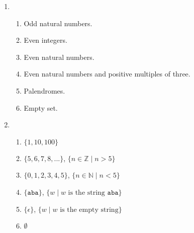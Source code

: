 \documentclass[11pt]{article}
\begin{document}
\begin{enumerate}[0.1]
  \item
  \begin{enumerate}
    \item Odd natural numbers.
    \item Even integers.
    \item Even natural numbers.
    \item Even natural numbers and positive multiples of three.
    \item Palendromes.
    \item Empty set.
  \end{enumerate}
  \item
  \begin{enumerate}
    \item $\{1,10,100\}$
    \item $\{5,6,7,8,...\}$, $\{n \in \mathbb{Z} \mid n > 5\}$
    \item $\{0,1,2,3,4,5\}$, $\{n \in \mathbb{N} \mid n < 5\}$
    \item $\{\texttt{aba}\}$, $\{w \mid w \text{ is the string } \texttt{aba}\}$
    \item $\{\epsilon\}$, $\{w \mid w \text{ is the empty string}\}$
    \item $\emptyset$
  \end{enumerate}
\end{enumerate}
\end{document}
